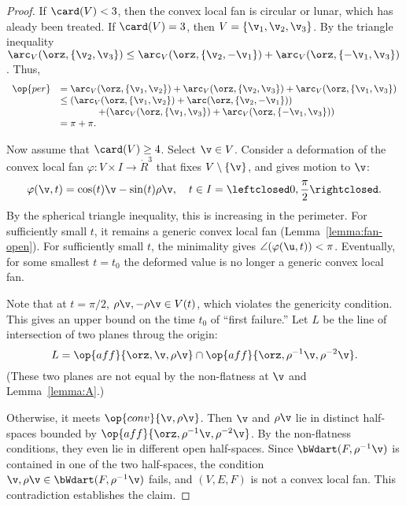 \begin{proof}
If $\card(V) <3$, then the convex local fan is circular or lunar, which has
aleady been treated.  If $\card(V)=3$, then $V=\{\v_1,\v_2,\v_3\}$.
By the triangle inequality $\arc_V(\orz,\{\v_2,\v_3\}) \le
\arc_V(\orz,\{\v_2,-\v_1\})+\arc_V(\orz,\{-\v_1,\v_3\})$.  Thus,
\begin{displaymath}
\begin{array}{rll}
  \op{per} &=\arc_V(\orz,\{\v_1,\v_2\}) 
  + \arc_V(\orz,\{\v_2,\v_3\}) 
  + \arc_V(\orz,\{\v_1,\v_3\})\\
  &\le(\arc_V(\orz,\{\v_1,\v_2\})+\arc(\orz,\{\v_2,-\v_1\}))
  \\&\qquad\qquad+(\arc_V(\orz,\{\v_1,\v_3\})
+\arc_V(\orz,\{-\v_1,\v_3\})) \\
  &= \pi+\pi.
\end{array}
\end{displaymath}

Now assume that $\card(V)\ge 4$.  Select $\v\in V$.  Consider a
deformation of the convex local fan $\varphi:V\times I \to \ring{R}^3$ that
fixes $V\setminus\{\v\}$, and gives motion to $\v$:
\begin{displaymath}
\varphi(\v,t) = \cos(t) \v - \sin(t) \rho \v,\quad t \in I=\leftclosed0,\frac{\pi}{2}\rightclosed.
\end{displaymath}
By the spherical triangle inequality, this is increasing in the
perimeter.  For sufficiently small $t$, it remains a generic convex local fan
(Lemma~\ref{lemma:fan-open}).  For sufficiently small $t$, the
minimality gives $\angle(\varphi(\u,t))<\pi$.  Eventually, for some
smallest $t=t_0$ the deformed value is no longer a generic convex local fan.

Note that at $t=\pi/2$, $\rho\v,-\rho\v\in V(t)$, which violates the genericity condition.
This gives an upper bound on the time $t_0$ of ``first failure.''  
Let $L$ be the line of intersection of two planes throug the origin:
\begin{displaymath}
L= \op{aff}\{\orz,\v,\rho\v\}
\cap\op{aff}\{\orz,\rho^{-1}\v,\rho^{-2}\v\}.
\end{displaymath}
(These two planes are not equal by the non-flatness  at $\v$ and Lemma~\ref{lemma:A}.)

Otherwise, it meets $\op{conv}\{\v,\rho\v\}$.  Then $\v$ and $\rho\v$
lie in distinct half-spaces bounded by
$\op{aff}\{\orz,\rho^{-1}\v,\rho^{-2}\v\}$.  By the non-flatness conditions, they even
lie in different open half-spaces.  Since
$\bWdart(F,\rho^{-1}\v)$ is contained in one of the two  half-spaces,
the condition $\v,\rho\v\in \bWdart(F,\rho^{-1}\v)$ fails, and
$(V,E,F)$ is not a convex local fan.  This contradiction establishes the
claim.


\end{proof}
